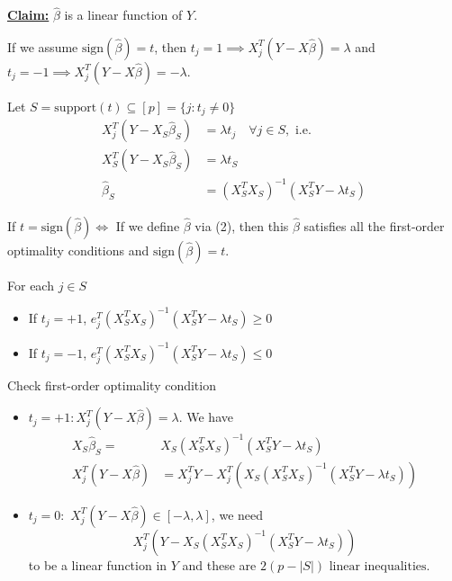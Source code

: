   \textbf{\underline{Claim:}} $\hat{\beta}$ is a linear function of $Y$. 
        
If we assume $\text{sign}(\hat{\beta}) = t$, then $t_j = 1 \implies X_j^T (Y - X\hat{\beta}) = \lambda$ and $t_j = -1 \implies X_j^T (Y - X\hat{\beta})= -\lambda$.

Let $S = \text{support}(t) \subseteq [p] = \{j : t_j \neq 0\}$
\begin{align*}
    X_j^T (Y - X_S \hat{\beta}_S) &= \lambda t_j \quad \forall j \in S, \text{ i.e.} \\
    X_S^T (Y - X_S \hat{\beta}_S) &= \lambda t_S \\
    \hat{\beta}_S &= (X_S^T X_S)^{-1} (X_S^T Y - \lambda t_S)
\end{align*}

If $t = \text{sign}(\hat{\beta}) \iff$ If we define $\hat{\beta}$ via (2), then this $\hat{\beta}$ satisfies all the first-order optimality conditions and $\text{sign}(\hat{\beta}) = t$.

For each $j \in S$
\begin{itemize}
    \item If $t_j = +1$, $e_j^T (X_S^T X_S)^{-1} (X_S^T Y - \lambda t_S) \ge 0$
    \item If $t_j = -1$, $e_j^T (X_S^T X_S)^{-1} (X_S^T Y - \lambda t_S) \le 0$
\end{itemize}

Check first-order optimality condition
\begin{itemize}
    \item $t_j = +1 : X_j^T (Y - X\hat{\beta}) = \lambda$. We have 
    \begin{align*}
         X_S \hat{\beta}_S =& X_S (X_S^T X_S)^{-1} (X_S^T Y - \lambda t_S) \\
        X_j^T (Y - X\hat{\beta}) &= X_j^T Y - X_j^T (X_S (X_S^T X_S)^{-1} (X_S^T Y - \lambda t_S)) 
    \end{align*}

     \item $t_j = 0 :$ $X_j^T (Y - X\hat{\beta}) \in [-\lambda, \lambda]$, we need 
\[ X_j^T (Y - X_S (X_S^T X_S)^{-1} (X_S^T Y - \lambda t_S)) \]
to be a linear function in $Y$ and these are $2(p - |S|) \text{ linear inequalities}$.
\end{itemize}
